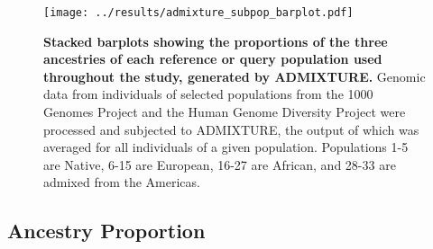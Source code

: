 \documentclass[11pt]{article}
\begin{document}







\vspace{1cm} %
\begin{figure}[htb!]%
    \centering
    \texttt{[image: 
        ../results/admixture\_subpop\_barplot.pdf]} 
    \vspace{-0.2cm}
    \caption{\textbf{
        Stacked barplots showing the proportions of the three ancestries of each reference or query population used throughout the study, generated by ADMIXTURE.
    }
        Genomic data from individuals of selected populations from the 1000 Genomes Project and the Human Genome Diversity Project were processed and subjected to ADMIXTURE, the output of which was averaged for all individuals of a given population. Populations 1-5 are Native, 6-15 are European, 16-27 are African, and 28-33 are admixed from the Americas.
    }
\end{figure}

\subsection{Ancestry Proportion}
\end{document}
